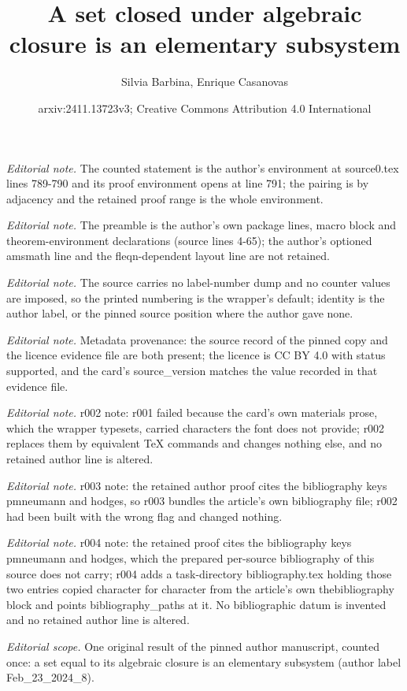 \documentclass[10pt,a4paper]{article}
\title{A set closed under algebraic closure is an elementary subsystem}
\author{Silvia Barbina, Enrique Casanovas}
\date{arxiv:2411.13723v3; Creative Commons Attribution 4.0 International}
\theoremstyle{note}
\begin{document}
\maketitle
\noindent\textit{Editorial note.} The counted statement is the author's environment at source0.tex lines 789-790 and its proof environment opens at line 791; the pairing is by adjacency and the retained proof range is the whole environment.\par\medskip
\noindent\textit{Editorial note.} The preamble is the author's own package lines, macro block and theorem-environment declarations (source lines 4-65); the author's optioned amsmath line and the fleqn-dependent layout line are not retained.\par\medskip
\noindent\textit{Editorial note.} The source carries no label-number dump and no counter values are imposed, so the printed numbering is the wrapper's default; identity is the author label, or the pinned source position where the author gave none.\par\medskip
\noindent\textit{Editorial note.} Metadata provenance: the source record of the pinned copy and the licence evidence file are both present; the licence is CC BY 4.0 with status supported, and the card's source\_version matches the value recorded in that evidence file.\par\medskip
\noindent\textit{Editorial note.} r002 note: r001 failed because the card's own materials prose, which the wrapper typesets, carried characters the font does not provide; r002 replaces them by equivalent TeX commands and changes nothing else, and no retained author line is altered.\par\medskip
\noindent\textit{Editorial note.} r003 note: the retained author proof cites the bibliography keys pmneumann and hodges, so r003 bundles the article's own bibliography file; r002 had been built with the wrong flag and changed nothing.\par\medskip
\noindent\textit{Editorial note.} r004 note: the retained proof cites the bibliography keys pmneumann and hodges, which the prepared per-source bibliography of this source does not carry; r004 adds a task-directory bibliography.tex holding those two entries copied character for character from the article's own thebibliography block and points bibliography\_paths at it. No bibliographic datum is invented and no retained author line is altered.\par\medskip
\noindent\textit{Editorial scope.} One original result of the pinned author manuscript, counted once: a set equal to its algebraic closure is an elementary subsystem (author label Feb\_23\_2024\_8).\par\medskip
\end{document}
